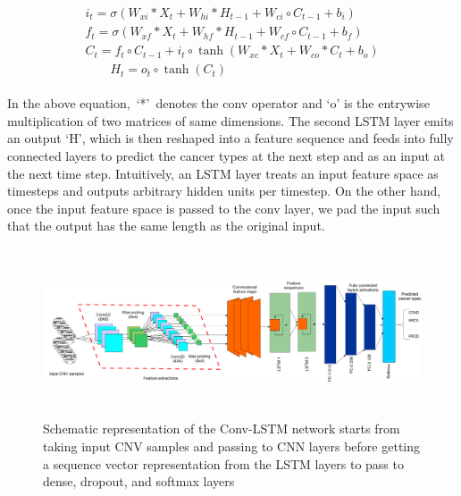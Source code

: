 \vspace{-4mm}
\begin{align}
    \begin{array}{c}
            {i_{t}=\sigma\left(W_{x i} * {X}_{t}+W_{h i} * {H}_{t-1}+W_{c i} \circ {C}_{t-1}+b_{i}\right)} \\
            {f_{t}=\sigma\left(W_{x f} * {X}_{t}+W_{h f} * {H}_{t-1}+W_{c f} \circ {C}_{t-1}+b_{f}\right)} \\
            {{C}_{t}=f_{t} \circ {C}_{t-1}+i_{t} \circ \tanh \left(W_{x c} * {X}_{t}+W_{c o} * {C}_{t}+b_{o}\right)} \\
            {\qquad {H}_{t}=o_{t} \circ \tanh \left({C}_{t}\right)}
    \end{array}
\end{align}
\vspace{-4mm}

\hspace*{3.5mm} In the above equation,~`*'~denotes the conv operator and `o' is the entrywise multiplication of two matrices of same dimensions. The second LSTM layer emits an output `H', which is then reshaped into a feature sequence and feeds into fully connected layers to predict the cancer types at the next step and as an input at the next time step. Intuitively, an LSTM layer treats an input feature space as timesteps and outputs arbitrary hidden units per timestep. On the other hand, once the input feature space is passed to the conv layer, we pad the input such that the output has the same length as the original input. 

\begin{figure}
	\centering
	\includegraphics[width=\linewidth,height=50mm]{images/conv_lstm.png} 
	\caption{Schematic representation of the Conv-LSTM network starts from taking input CNV samples and passing to CNN layers before getting a sequence vector representation from the LSTM layers to pass to dense, dropout, and softmax layers~\cite{karimACCA2019}}	
	\label{fig:conv_lstm}
	\vspace{-2mm}
\end{figure}

